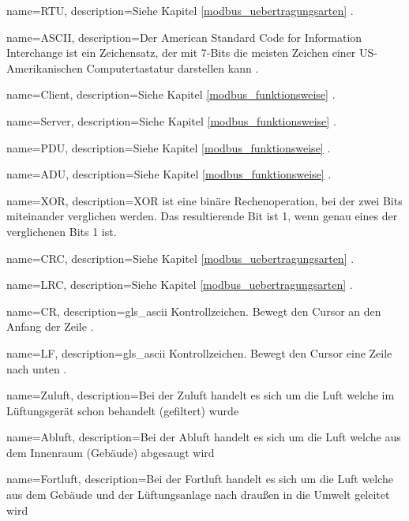 {
	name=RTU,
	description={Siehe Kapitel \ref{modbus_uebertragungsarten} .}
}

{
	name=ASCII,
	description={Der American Standard Code for Information Interchange ist ein Zeichensatz, der mit 7-Bits die meisten Zeichen einer US-Amerikanischen Computertastatur darstellen kann \cite{seo_kueche_ascii:o.J.}.}
}

{
	name=Client,
	description={Siehe Kapitel \ref{modbus_funktionsweise} .}
}

{
	name=Server,
	description={Siehe Kapitel \ref{modbus_funktionsweise} .}
}

{
	name=PDU,
	description={Siehe Kapitel \ref{modbus_funktionsweise} .}
}

{
	name=ADU,
	description={Siehe Kapitel \ref{modbus_funktionsweise} .}
}

{
	name=XOR,
	description={XOR ist eine binäre Rechenoperation, bei der zwei Bits miteinander verglichen werden. Das resultierende Bit ist 1, wenn genau eines der verglichenen Bits 1 ist.}
}

{
	name=CRC,
	description={Siehe Kapitel \ref{modbus_uebertragungsarten} .}
}

{
	name=LRC,
	description={Siehe Kapitel \ref{modbus_uebertragungsarten} .}
}

{
	name=CR,
	description={\gls{gls_ascii} Kontrollzeichen. Bewegt den Cursor an den Anfang der Zeile \cite{Mozilla_CRLF:2023}.}
}

{
	name=LF,
	description={\gls{gls_ascii} Kontrollzeichen. Bewegt den Cursor eine Zeile nach unten \cite{Mozilla_CRLF:2023}.}
}

{
	name=Zuluft,
	description={Bei der Zuluft handelt es sich um die Luft welche im Lüftungsgerät schon behandelt (gefiltert) wurde}
}

{
	name=Abluft,
	description={Bei der Abluft handelt es sich um die Luft welche aus dem Innenraum (Gebäude) abgesaugt wird}
}

{
	name=Fortluft,
	description={Bei der Fortluft handelt es sich um die Luft welche aus dem Gebäude und der Lüftungsanlage nach draußen in die Umwelt geleitet wird}
}

